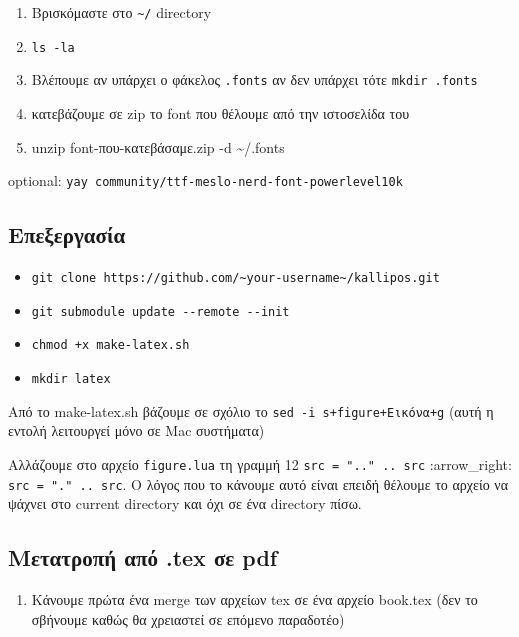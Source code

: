 \documentclass[
]{article}
\begin{document}
\begin{enumerate}
\item
  Βρισκόμαστε στο \texttt{\textasciitilde{}/} directory
\item
  \texttt{ls~-la}
\item
  Βλέπουμε αν υπάρχει ο φάκελος \texttt{.fonts} αν δεν υπάρχει τότε
  \texttt{mkdir~.fonts}
\item
  κατεβάζουμε σε zip το font που θέλουμε από την ιστοσελίδα του
\item
  unzip font-που-κατεβάσαμε.zip -d \textasciitilde/.fonts
\end{enumerate}

optional: \texttt{yay~community/ttf-meslo-nerd-font-powerlevel10k}

\hypertarget{ux3b5ux3c0ux3b5ux3beux3b5ux3c1ux3b3ux3b1ux3c3ux3afux3b1}{%
\subsection{Επεξεργασία}\label{ux3b5ux3c0ux3b5ux3beux3b5ux3c1ux3b3ux3b1ux3c3ux3afux3b1}}

\begin{itemize}
\item
  \texttt{git~clone~https://github.com/\textasciitilde{}your-username\textasciitilde{}/kallipos.git}
\item
  \texttt{git~submodule~update~-\/-remote~-\/-init}
\item
  \texttt{chmod~+x~make-latex.sh}
\item
  \texttt{mkdir~latex}
\end{itemize}

Από το make-latex.sh βάζουμε σε σχόλιο το
\texttt{sed~-i~s+figure+Εικόνα+g} (αυτή η εντολή λειτουργεί μόνο σε Mac
συστήματα)

Αλλάζουμε στο αρχείο \texttt{figure.lua} τη γραμμή 12
\texttt{src~=~".."~..~src} :arrow\_right: \texttt{src~=~"."~..~src}. Ο
λόγος που το κάνουμε αυτό είναι επειδή θέλουμε το αρχείο να ψάχνει στο
current directory και όχι σε ένα directory πίσω.

\hypertarget{ux3bcux3b5ux3c4ux3b1ux3c4ux3c1ux3bfux3c0ux3ae-ux3b1ux3c0ux3cc-.tex-ux3c3ux3b5-pdf}{%
\subsection{Μετατροπή από .tex σε
pdf}\label{ux3bcux3b5ux3c4ux3b1ux3c4ux3c1ux3bfux3c0ux3ae-ux3b1ux3c0ux3cc-.tex-ux3c3ux3b5-pdf}}

\begin{enumerate}
\item
  Κάνουμε πρώτα ένα merge των αρχείων tex σε ένα αρχείο book.tex (δεν το
  σβήνουμε καθώς θα χρειαστεί σε επόμενο παραδοτέο)
\end{enumerate}
\end{document}
